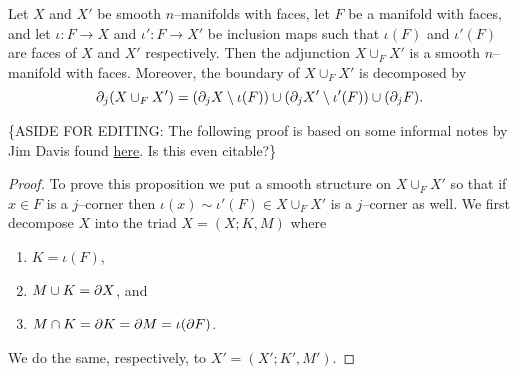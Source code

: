 \begin{prop}
	Let $X$ and $X'$ be smooth $n$--manifolds with faces, let $F$ be a manifold with faces, and let $\iota:F\to X$ and $\iota':F\to X'$ be inclusion maps such that $\iota(F)$ and $\iota'(F)$ are faces of $X$ and $X'$ respectively.
	Then the adjunction $X\cup_F X'$ is a smooth $n$--manifold with faces.
	Moreover, the boundary of $X\cup_F X'$ is decomposed by $$\partial_j( X \cup_F X') = (\partial_j X\setminus \iota(F))\cup(\partial_j X'\setminus \iota'(F))\cup(\partial_j F).$$
\end{prop}

\{ASIDE FOR EDITING:  The following proof is based on some informal notes by Jim Davis found \href{http://www.indiana.edu/~jfdavis/notes/m623/smooth_structures_and_handles.pdf}{here}. Is this even citable?\}

\begin{proof}
	To prove this proposition we put a smooth structure on $X\cup_F X'$ so that if $x\in F$ is a $j$--corner then $\iota(x)\sim \iota'(F)\in X\cup_F X'$ is a $j$--corner as well.
	We first decompose $X$ into the triad $X=(X;K,M)$ where
	\begin{enumerate}
		\item $K=\iota(F)$,
		\item $M\cup K=\partial X$, and
		\item $M\cap K=\partial K = \partial M =\iota(\partial F)$.
	\end{enumerate}
	We do the same, respectively, to $X'=(X';K',M')$.
	

\end{proof}
